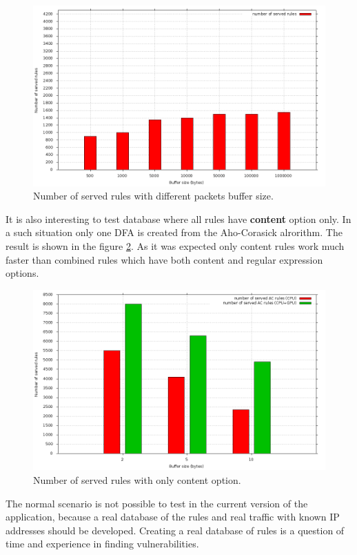 \documentclass[thesis=M,english]{FITthesis}[2011/07/15]
\begin{document}
\begin{figure}[h]
\centering
\includegraphics[scale=0.3]{images/graph2.png}
\caption{Number of served rules with different packets buffer size.}
\label{fig:graph2}
\end{figure}

It is also interesting to test database where all rules have \textbf{content} option only. In a such situation only one DFA is created from the Aho-Corasick alrorithm. The result is shown in the figure \ref{fig:graph3}. As it was expected only content rules work much faster than combined rules which have both content and regular expression options.

\begin{figure}[t]
\centering
\includegraphics[scale=0.3]{images/graph3.png}
\caption{Number of served rules with only content option.}
\label{fig:graph3}
\end{figure}

The normal scenario is not possible to test in the current version of the application, because a real database of the rules and real traffic with known IP addresses should be developed. Creating a real database of rules is a question of time and experience in finding vulnerabilities.
\end{document}
